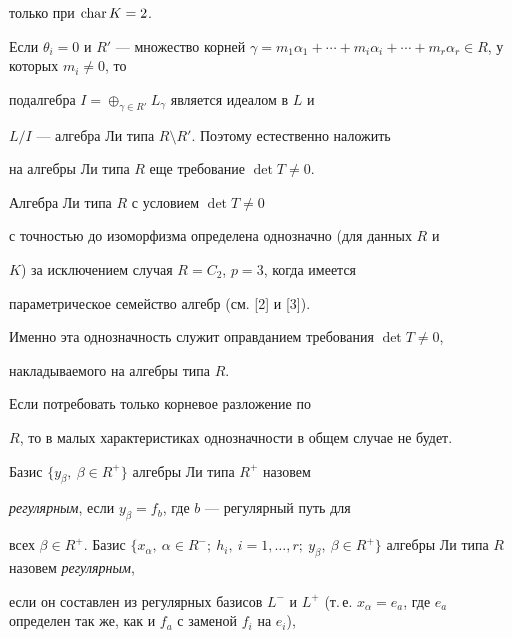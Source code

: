 только при $\operatorname{char} K=2$.





Если $\theta_i=0$ и $R'$ --- множество корней $\gamma=m_1\alpha_1


+\dotsb+m_i\alpha_i+\dotsb+m_r\alpha_r\in R$, у которых $m_i\ne 0$, то


подалгебра $I=\oplus_{\gamma\in R'}L_\gamma$ является идеалом в $L$ и


$L/I$ --- алгебра Ли типа $R\setminus R'$. Поэтому естественно наложить


на алгебры Ли типа $R$ еще требование $\det T\ne 0$.





\begin{cor}


Алгебра Ли типа $R$ с условием $\det T\ne0$


с точностью до изоморфизма определена однозначно (для данных $R$ и


$K$) за исключением случая $R=C_2$, $p=3$, когда имеется


параметрическое семейство алгебр (см. [2] и [3]).


\end{cor}


\addtocounter{footnote}{-1}





Именно эта однозначность служит оправданием требования $\det T\ne0$,


накладываемого на алгебры типа $R$.


Если потребовать только корневое разложение по


$R$, то в малых характеристиках однозначности в общем случае не будет.





Базис $\{y_\beta,\ \beta\in R^+\}$ алгебры Ли типа $R^+$ назовем


{\it регулярным}, если $y_\beta=f_b$, где $b$ --- регулярный путь для


всех $\beta\in R^+$. Базис $\{x_\alpha,\ \alpha\in R^-;\ h_i,\ i=1,\dotsc,r;


\ y_\beta,\ \beta\in R^+\}$ алгебры Ли типа $R$ назовем {\it регулярным},


если он составлен из регулярных базисов $L^-$ и $L^+$ (т.\,е. $x_\alpha=


e_a$, где $e_a$ определен так же, как и $f_a$ с заменой $f_i$ на $e_i$),


